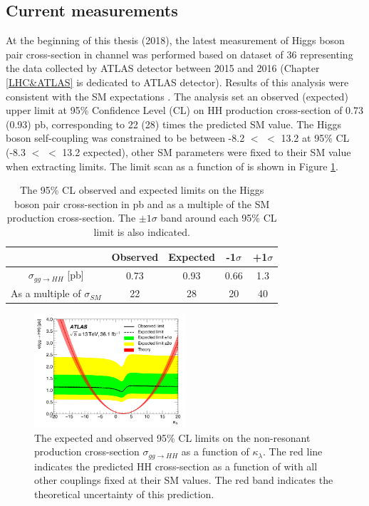 \subsection{Current measurements}
\label{chap1:HH:CM}
At the beginning of this thesis (2018), the latest measurement of Higgs boson pair cross-section in \HHyybb channel was performed based on dataset of 36 \ifb representing the data collected by ATLAS detector between 2015 and 2016 (Chapter \ref{LHC&ATLAS} is dedicated to ATLAS detector). Results of this analysis were consistent with the SM expectations \cite{yybb_36ifb}. The analysis set an observed (expected) upper limit at  95\% Confidence Level (CL) on HH production cross-section of 0.73 (0.93) pb, corresponding to 22 (28) times the predicted SM value. The Higgs boson self-coupling was constrained to be between -8.2 $<$ \kl $<$ 13.2 at 95\% CL (-8.3 $<$ \kl $<$ 13.2 expected), other SM parameters were fixed to their SM value when extracting limits. The limit scan as a function of \kl is shown in Figure \ref{fig:chap1:HH:CM:KL}. \\

\begin{table}[htbp]
    \centering
    \begin{tabular}{ccccc}
    \hline\hline
         & Observed & Expected & -1$\sigma$ & +1$\sigma$ \\
    \hline
        $\sigma_{gg\rightarrow HH}$ [pb] & 0.73 & 0.93 & 0.66 & 1.3 \\
        As a multiple of $\sigma_{SM}$ & 22 & 28 & 20 & 40 \\
    \hline\hline
    \end{tabular}
    \caption{The 95\% CL observed and expected limits on the Higgs boson pair cross-section in pb and as a multiple of the SM production cross-section. The $\pm1\sigma$ band around each 95\% CL limit is also indicated.}
    \label{tab:chap1:HH:CM:XSEC}
\end{table}
\begin{figure}[htbp]
    \centering
    \includegraphics[width=0.5\textwidth]{Ch1/Img/kl_36ifb.png}
    \caption{The expected and observed 95\% CL limits on the non-resonant production cross-section $\sigma_{gg\rightarrow HH}$ as a function of $\kappa_{\lambda}$. The red line indicates the predicted HH cross-section as a function of \kl with all other couplings fixed at their SM values. The red band indicates the theoretical uncertainty of this prediction.}
    \label{fig:chap1:HH:CM:KL}
\end{figure}

